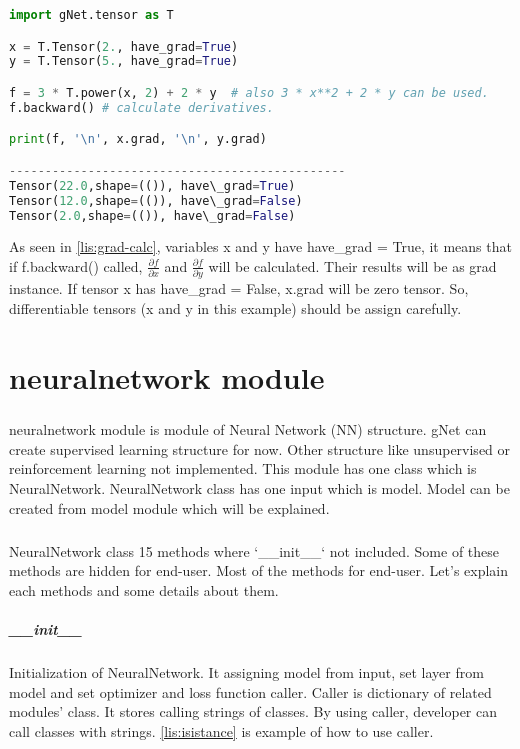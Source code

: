 \documentclass[12pt]{report}
\begin{document}
\begin{lstlisting}[language=Python, numbers=none, caption={Calculation of gradient.}, label={lis:grad-calc}]
import gNet.tensor as T

x = T.Tensor(2., have_grad=True)
y = T.Tensor(5., have_grad=True)

f = 3 * T.power(x, 2) + 2 * y  # also 3 * x**2 + 2 * y can be used.
f.backward() # calculate derivatives. 

print(f, '\n', x.grad, '\n', y.grad)

-----------------------------------------------
Tensor(22.0,shape=(()), have\_grad=True) 
Tensor(12.0,shape=(()), have\_grad=False)
Tensor(2.0,shape=(()), have\_grad=False)

\end{lstlisting}

As seen in \ref{lis:grad-calc}, variables x and y have have\_grad = True, it means that if f.backward() called, $\frac{\partial f}{\partial x}$ and  $\frac{\partial f}{\partial y}$ will be calculated. Their results will be as grad instance. If tensor x has have\_grad = False, x.grad will be zero tensor. So, differentiable tensors (x and y in this example) should be assign carefully.





\chapter{neuralnetwork module}

\paragraph{}
neuralnetwork module is module of Neural Network (NN) structure. gNet can create supervised learning structure for now. Other structure like unsupervised or reinforcement learning not implemented. This module has one class which is NeuralNetwork. NeuralNetwork class has one input which is model. Model can be created from model module which will be explained. 

\paragraph{}
NeuralNetwork class 15 methods where `\_\_init\_\_` not included. Some of these methods are hidden for end-user. Most of the methods for end-user. Let's explain each methods and some details about them.

\paragraph{\_\_init\_\_}
Initialization of NeuralNetwork. It assigning model from input, set layer from model and set optimizer and loss function caller. Caller is dictionary of related modules' class. It stores calling strings of classes. By using caller, developer can call classes with strings. \ref{lis:isistance} is example of how to use caller.
\end{document}
